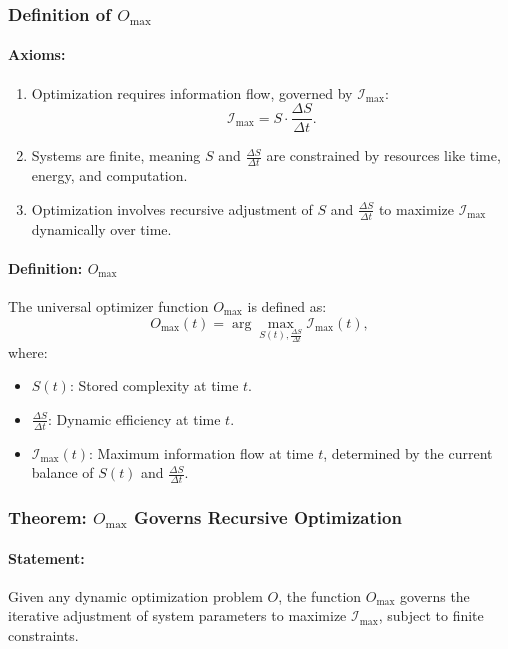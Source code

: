 \documentclass[12pt]{article}
\begin{document}
\subsubsection{Definition of \(O_{\text{max}}\)}

\paragraph{Axioms:}
\begin{enumerate}
    \item Optimization requires information flow, governed by \(\mathcal{I}_{\text{max}}\):
    \[
    \mathcal{I}_{\text{max}} = S \cdot \frac{\Delta S}{\Delta t}.
    \]
    \item Systems are finite, meaning \(S\) and \(\frac{\Delta S}{\Delta t}\) are constrained by resources like time, energy, and computation.
    \item Optimization involves recursive adjustment of \(S\) and \(\frac{\Delta S}{\Delta t}\) to maximize \(\mathcal{I}_{\text{max}}\) dynamically over time.
\end{enumerate}

\paragraph{Definition: \(O_{\text{max}}\)}
The universal optimizer function \(O_{\text{max}}\) is defined as:
\[
O_{\text{max}}(t) = \arg \max_{S(t), \frac{\Delta S}{\Delta t}} \mathcal{I}_{\text{max}}(t),
\]
where:
\begin{itemize}
    \item \(S(t)\): Stored complexity at time \(t\).
    \item \(\frac{\Delta S}{\Delta t}\): Dynamic efficiency at time \(t\).
    \item \(\mathcal{I}_{\text{max}}(t)\): Maximum information flow at time \(t\), determined by the current balance of \(S(t)\) and \(\frac{\Delta S}{\Delta t}\).
\end{itemize}


\subsubsection{Theorem: \(O_{\text{max}}\) Governs Recursive Optimization}

\paragraph{Statement:}
Given any dynamic optimization problem \(O\), the function \(O_{\text{max}}\) governs the iterative adjustment of system parameters to maximize \(\mathcal{I}_{\text{max}}\), subject to finite constraints.
\end{document}
